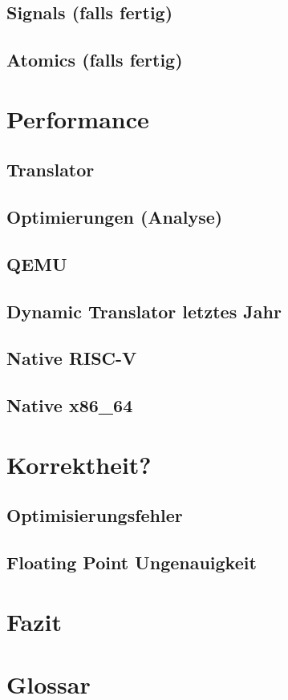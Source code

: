 \documentclass[course=eragp]{aspdoc}
\begin{document}
\subsection{Signals (falls fertig)}
\subsection{Atomics (falls fertig)}

\clearpage

\section{Performance}
\subsection{Translator}
\subsection{Optimierungen (Analyse)}
\subsection{QEMU}
\subsection{Dynamic Translator letztes Jahr}
\subsection{Native RISC-V}
\subsection{Native x86\_64}

\section{Korrektheit?}
\subsection{Optimisierungsfehler}
\subsection{Floating Point Ungenauigkeit}

\section{Fazit}

\section{Glossar}


{}
\end{document}

